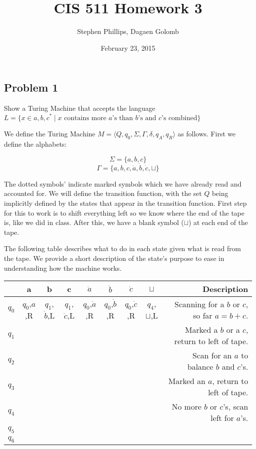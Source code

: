 \documentclass[english]{article}
\title{CIS 511 Homework 3}
\author{Stephen Phillips, Dagaen Golomb}
\date{February 23, 2015}
\begin{document}
\maketitle
\subsection*{Problem 1}
Show a Turing Machine that accepts the language
 $L = \{ x \in {a,b,c}^* \mid 
         \textrm{$x$ contains more $a$'s than $b$'s and $c$'s combined} \}$

We define the Turing Machine 
$M = \langle Q,q_0,\Sigma,\Gamma,\delta,q_A, q_R \rangle $ as follows. First
we define the alphabets:

\[ \Sigma = \{a,b,c\} \]
\[ \Gamma = \{a,b,c,\dot{a},\dot{b},\dot{c}, \sqcup \} \]

The dotted symbols' indicate marked symbols which we have already read and
accounted for. We will define the transition function, with the set $Q$ being
implicitly defined by the states that appear in the transition function. First
step for this to work is to shift everything left so we know where the end of the 
tape is, like we did in class. After this, we have a blank symbol ($\sqcup$) at each
end of the tape.

The following table describes what to do in each state given what is read from the
tape. We provide a short description of the state's purpose to ease in understanding
how the machine works.

\begin{center}
	\begin{tabular}{ l | c | c | c | c | c | c | c | r }
		& a & b & c & $\dot{a}$ & $\dot{b}$ & $\dot{c}$ & $\sqcup$ & Description\\
		\hline
		$q_0$ & $q_0$,$a$,R & $q_1$,$\dot{b}$,L & $q_1$,$\dot{c}$,L & $q_0$,$\dot{a}$,R & $q_0$,$\dot{b}$,R & $q_0$,$\dot{c}$,R & $q_4$,$\sqcup$,L & Scanning for a $b$ or $c$, so far $a=b+c$. \\ \hline
		$q_1$ &&&&&&&& Marked a $b$ or a $c$, return to left of tape.\\ \hline
		$q_2$ &&&&&&&& Scan for an $a$ to balance $b$ and $c$'s.\\ \hline
		$q_3$ &&&&&&&& Marked an $a$, return to left of tape.\\ \hline
		$q_4$ &&&&&&&& No more $b$ or $c$'s, scan left for $a$'s.\\ \hline
		$q_5$ &&&&&&&& \\ \hline
		$q_6$ &&&&&&&& \\
		\hline
	\end{tabular}
\end{center}
\end{document}
